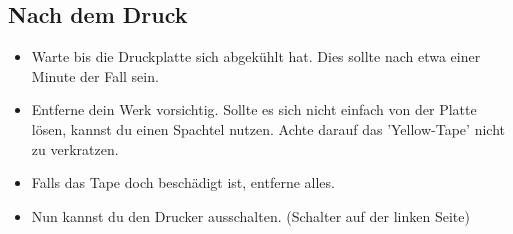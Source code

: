 \documentclass[a4paper]{article}
\begin{document}
\subsection{Nach dem Druck}
\begin{itemize}
	\item Warte bis die Druckplatte sich abgekühlt hat. Dies sollte nach etwa einer Minute der Fall sein.
	\item Entferne dein Werk vorsichtig. Sollte es sich nicht einfach von der Platte lösen, kannst du einen Spachtel nutzen. Achte darauf das 'Yellow-Tape' nicht zu verkratzen.
	\item Falls das Tape doch beschädigt ist, entferne alles.
	\item Nun kannst du den Drucker ausschalten. (Schalter auf der linken Seite)
\end{itemize}
\end{document}
